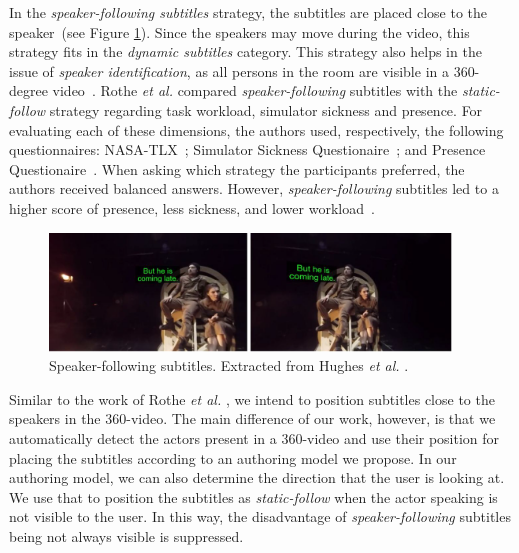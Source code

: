 In the \emph{speaker-following subtitles} strategy, the subtitles are placed close to the speaker~(see Figure \ref{fig:speaker_following}). Since the speakers may move during the video, this strategy fits in the \emph{dynamic subtitles} category. This strategy also helps in the issue of \emph{speaker identification}, as all persons in the room are visible in a 360-degree video~\cite{rothe_dynamic_2018}.  
Rothe \emph{et al.} \cite{rothe_dynamic_2018} compared \emph{speaker-following} subtitles with the \emph{static-follow} strategy regarding task workload, simulator sickness and presence. For evaluating each of these dimensions, the authors used, respectively, the following questionnaires: NASA-TLX~\cite{nasa_hart1988development}; Simulator Sickness Questionaire~\cite{sickness_kennedy1993simulator}; and Presence Questionaire~\cite{presence_witmer1998measuring}. When asking which strategy the participants preferred, the authors received balanced answers. However, \emph{speaker-following} subtitles led to a higher score of presence, less sickness, and lower workload~\cite{rothe_dynamic_2018}.

\begin{figure}[!ht]
    \centering
    \includegraphics[width=0.95\textwidth]{img/video360/speaker-following.png}
    \caption{Speaker-following subtitles. Extracted from Hughes \emph{et al.} \cite{hughes_disruptive_2019}.}
    \label{fig:speaker_following}
\end{figure}

Similar to the work of Rothe \emph{et al.} \cite{rothe_dynamic_2018}, we intend to position subtitles close to the speakers in the 360-video. The main difference of our work, however, is that we automatically detect the actors present in a 360-video and use their position for placing the subtitles according to an authoring model we propose. In our authoring model, we can also determine the direction that the user is looking at. We use that to position the subtitles as \emph{static-follow} when the actor speaking is not visible to the user. In this way, the disadvantage of \emph{speaker-following} subtitles being not always visible is suppressed.